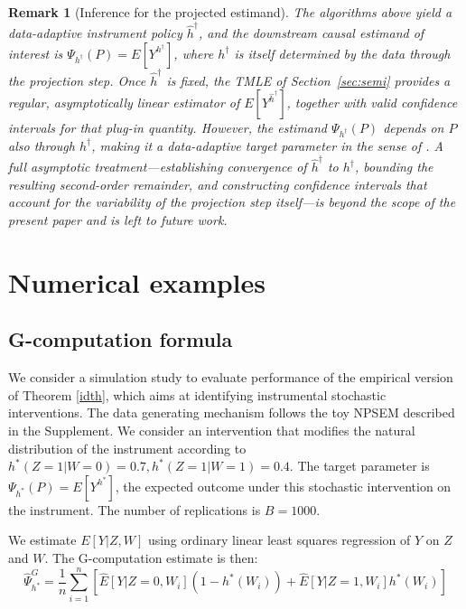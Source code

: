 \documentclass[12pt]{article}
\theoremstyle{thmstyleone}%
\theoremstyle{thmstyletwo}%
\newtheorem{rem}{Remark}%
\theoremstyle{thmstylethree}%
\begin{document}
 {\begin{rem}[Inference for the projected estimand]
\label{rem:inference-projection}
The algorithms above yield a data-adaptive instrument policy $\hat{h}^\dagger$, and the downstream causal estimand of interest is $\Psi_{h^\dagger}(P) = E[Y^{h^\dagger}]$, where $h^\dagger$ is itself determined by the data through the projection step. Once $\hat{h}^\dagger$ is fixed, the TMLE of Section~\ref{sec:semi} provides a regular, asymptotically linear estimator of $E[Y^{\hat{h}^\dagger}]$, together with valid confidence intervals for that plug-in quantity. However, the estimand $\Psi_{h^\dagger}(P)$ depends on $P$ also through $h^\dagger$, making it a data-adaptive target parameter in the sense of \citet{hubbard2016statistical}. A full asymptotic treatment---establishing convergence of $\hat{h}^\dagger$ to $h^\dagger$, bounding the resulting second-order remainder, and constructing confidence intervals that account for the variability of the projection step itself---is beyond the scope of the present paper and is left to future work.
\end{rem}}


\section{Numerical examples}



\subsection{G-computation formula}\label{sec:sim1}





We consider a simulation study to evaluate performance of the empirical version of Theorem \ref{idth}, which aims at identifying instrumental stochastic interventions. The data generating mechanism follows the toy NPSEM described in the Supplement. We consider an intervention that modifies the natural distribution of the instrument according to $h^*(Z=1|W=0) = 0.7, h^*(Z=1|W=1) = 0.4$. The target parameter is $\Psi_{h^*}(P) = E[Y^{h^*}]$, the expected outcome under this stochastic intervention on the instrument. The number of replications is $B = 1000$.

We estimate $E[Y|Z,W]$ using ordinary linear least squares regression of $Y$ on $Z$ and $W$. The G-computation estimate is then:
$$\hat{\Psi}^{G}_{h^*} = \frac{1}{n}\sum_{i=1}^n \left[\hat{E}[Y|Z=0,W_i](1-h^*(W_i)) + \hat{E}[Y|Z=1,W_i]h^*(W_i)\right]$$
\end{document}
